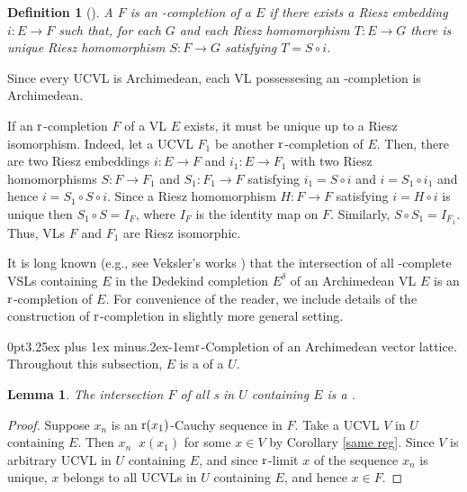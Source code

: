 \documentclass[12pt]{article}
\makeatletter
\newtheorem{lem}{Lemma}
\newtheorem{defi}{Definition}
\DeclareMathOperator{\ruc}{\xrightarrow[]{r}}
\renewcommand{\subsection}{\@startsection{subsection}{1}
{0pt}{3.25ex plus 1ex minus.2ex}{-1em}{\normalfont\normalsize\bf}}
\makeatother
\begin{document}
\begin{defi}[]\label{d00}
A  $F$ is an -{\em completion} 
of a  $E$ if there exists a Riesz embedding $i: E\to F$ such that, 
for each  $G$ and each Riesz homomorphism $T: E\to G$ 
there is unique Riesz homomorphism $S: F\to G$ satisfying $T=S\circ i$.
\end{defi}

Since every UCVL is Archimedean, each VL possessesing an -completion
is Archimedean. 

\smallskip
If an $\text{\rm r}$-completion $F$ of a VL $E$
exists, it must be unique up to a Riesz isomorphism. Indeed,
let a UCVL $F_1$ be another $\text{\rm r}$-completion of $E$. 
Then, there are two 
Riesz embeddings $i: E\to F$ and $i_1: E\to F_1$ with two 
Riesz homomorphisms $S: F\to F_1$ and $S_1: F_1\to F$ 
satisfying $i_1=S\circ i$ and $i=S_1\circ i_1$
and hence $i=S_1\circ S\circ i$. 
Since a Riesz homomorphism $H: F\to F$ satisfying $i=H\circ i$ is unique then $S_1\circ S=I_F$,
where $I_F$ is the identity map on $F$.
Similarly, $S\circ S_1=I_{F_1}$. Thus, VLs $F$ and $F_1$ are Riesz isomorphic.

\smallskip
It is long known (e.g., see Veksler's works \cite{Veks1,Veks2}) that the intersection 
of all -complete VSLs containing $E$ in the Dedekind completion 
$E^\delta$ of an Archimede\-an VL $E$ is an $\text{\rm r}$-completion of $E$. 
For convenience of the reader, we include details of the construction of $\text{\rm r}$-completion 
in slightly more general setting. 

\subsection{$\text{\rm r}$-Completion of an Archimedean vector lattice.}
Throughout this subsection, $E$ is a  of a  $U$.

\begin{lem}\label{Rem1}
The intersection $F$ of all s in $U$ containing $E$ is a .
\end{lem}

\begin{proof}
Suppose $x_n$ is an $\text{\rm r}(x_1)$-Cauchy sequence in $F$. 
Take a UCVL $V$ in $U$ containing $E$. Then $x_n\ruc x(x_1)$ for some $x\in V$ 
by Corollary \ref{same reg}. Since $V$ is arbitrary UCVL in $U$ containing $E$, 
and since $\text{\rm r}$-limit $x$ of the sequence $x_n$ is unique, $x$ belongs 
to all UCVLs in $U$ containing $E$, and hence $x\in F$.
\end{proof}
\end{document}
